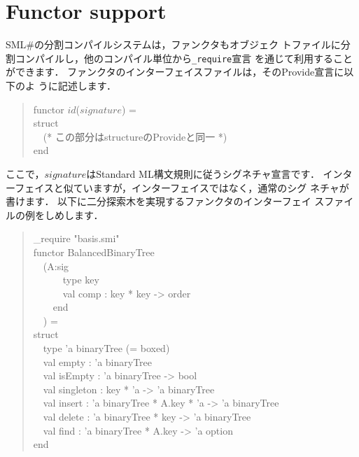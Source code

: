 \documentclass{jbook}
\newcommand{\txt}[2]{#2}
\newcommand{\smlsharp}{SML\#}
\newcommand{\myem}{\mbox{\ \ }}
\newenvironment{program}{\begin{quote}\begin{tt}}%
                        {\end{tt}\end{quote}}
\begin{document}
\section{\txt{ファンクタのサポート}{Functor support}}
\label{sec:tutorialFunctorInInterface}

\ifjp%
	\smlsharp{}の分割コンパイルシステムは，ファンクタもオブジェク
トファイルに分割コンパイルし，他のコンパイル単位から{\tt \_require}宣言
を通じて利用することができます．
	ファンクタのインターフェイスファイルは，そのProvide宣言に以下のよ
うに記述します．
\begin{program}
functor $id$($signature$) =\\
struct\\
\myem (* この部分はstructureのProvideと同一 *)\\
end
\end{program}
	ここで，$signature$はStandard ML構文規則に従うシグネチャ宣言です．
	インターフェイスと似ていますが，インターフェイスではなく，通常のシグ
ネチャが書けます．
	以下に二分探索木を実現するファンクタのインターフェイ
スファイルの例をしめします．
\begin{program}
\_require "basis.smi"\\
functor BalancedBinaryTree\\
\myem  (A:sig\\
\myem\myem\myem      type key\\
\myem\myem\myem      val comp : key * key -> order\\
\myem\myem    end\\
\myem  ) =\\
struct\\
\myem type 'a binaryTree (= boxed)\\
\myem  val empty : 'a binaryTree\\
\myem  val isEmpty : 'a binaryTree -> bool\\
\myem  val singleton : key * 'a -> 'a binaryTree\\
\myem  val insert : 'a binaryTree * A.key * 'a -> 'a binaryTree\\
\myem  val delete : 'a binaryTree * key -> 'a binaryTree\\
\myem  val find : 'a binaryTree * A.key -> 'a option\\
end
\end{program}
\end{document}

